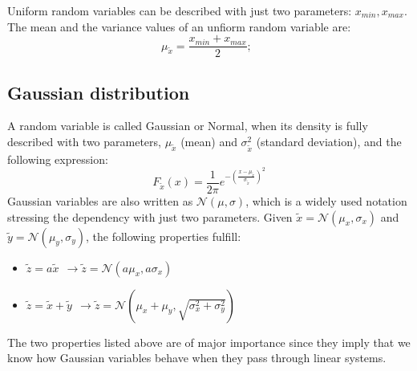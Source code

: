 Uniform random variables can be described with just two parameters: $x_{min}, x_{max}$. The mean and the variance values of an unfiorm random variable are:
\begin{equation}
 \mu_{\tilde{x}} = \frac{x_{min}+x_{max}}{2}; \ \ 
\end{equation}


\subsection{Gaussian distribution}
A random variable is called Gaussian or Normal, when its density is fully described with two parameters, $\mu_{\tilde{x}}$ (mean) and $\sigma^2_{\tilde{x}}$ (standard deviation), and the following expression:
\begin{equation}
 F_{\tilde{x}}(x) = \frac{1}{2\pi}e^{-(\frac{x-\mu_{\tilde{x}}}{\sigma_{\tilde{x}}})^2}
\end{equation}
Gaussian variables are also written as $\mathcal{N}(\mu,\sigma)$, which is a widely used notation stressing the dependency with just two parameters. Given $\tilde{x}=\mathcal{N}(\mu_x,\sigma_x)$ and $\tilde{y}=\mathcal{N}(\mu_y,\sigma_y)$, the following properties fulfill:
\begin{itemize}
 \item $\tilde{z}=a\tilde{x} \ \ \rightarrow \tilde{z}=\mathcal{N}(a\mu_x,a\sigma_x)$
 \item $\tilde{z}=\tilde{x}+\tilde{y} \ \ \rightarrow \tilde{z}=\mathcal{N}(\mu_x+\mu_y,\sqrt{\sigma^2_x+\sigma^2_y})$
\end{itemize}
The two properties listed above are of major importance since they imply that we know how Gaussian variables behave when they pass through linear systems. 


